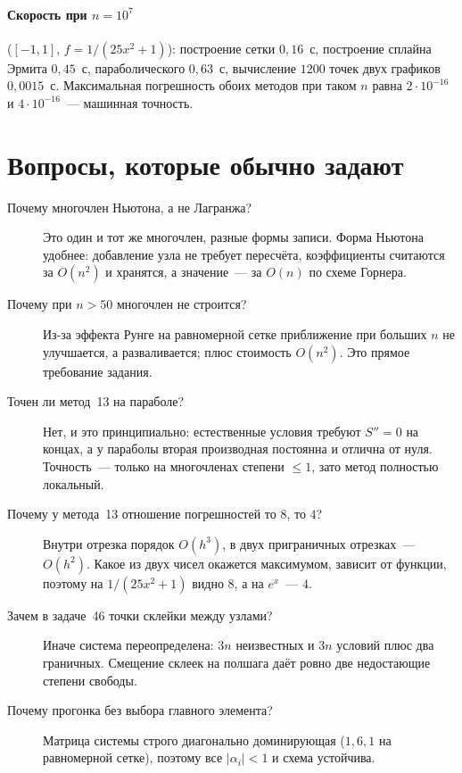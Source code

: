 \documentclass[11pt,a4paper]{report}
\begin{document}
\paragraph{Скорость при $n=10^7$} ($[-1,1]$, $f=1/(25x^2+1)$):
построение сетки $0{,}16$~с, построение сплайна Эрмита $0{,}45$~с,
параболического $0{,}63$~с, вычисление $1200$ точек двух графиков
$0{,}0015$~с. Максимальная погрешность обоих методов при таком $n$ равна
$2\cdot10^{-16}$ и $4\cdot10^{-16}$~--- машинная точность.

\section{Вопросы, которые обычно задают}

\begin{description}
\item[Почему многочлен Ньютона, а не Лагранжа?] Это один и тот же многочлен,
разные формы записи. Форма Ньютона удобнее: добавление узла не требует
пересчёта, коэффициенты считаются за $O(n^2)$ и хранятся, а значение~--- за
$O(n)$ по схеме Горнера.

\item[Почему при $n>50$ многочлен не строится?] Из-за эффекта Рунге на
равномерной сетке приближение при больших $n$ не улучшается, а разваливается;
плюс стоимость $O(n^2)$. Это прямое требование задания.

\item[Точен ли метод~13 на параболе?] Нет, и это принципиально: естественные
условия требуют $S''=0$ на концах, а у параболы вторая производная постоянна и
отлична от нуля. Точность~--- только на многочленах степени $\le1$, зато метод
полностью локальный.

\item[Почему у метода~13 отношение погрешностей то $8$, то $4$?] Внутри
отрезка порядок $O(h^3)$, в двух приграничных отрезках~--- $O(h^2)$. Какое из
двух чисел окажется максимумом, зависит от функции, поэтому на $1/(25x^2+1)$
видно $8$, а на $e^x$~--- $4$.

\item[Зачем в задаче~46 точки склейки между узлами?] Иначе система
переопределена: $3n$ неизвестных и $3n$ условий плюс два граничных. Смещение
склеек на полшага даёт ровно две недостающие степени свободы.

\item[Почему прогонка без выбора главного элемента?] Матрица системы строго
диагонально доминирующая ($1,6,1$ на равномерной сетке), поэтому все
$|\alpha_i|<1$ и схема устойчива.


\end{description}
\end{document}
